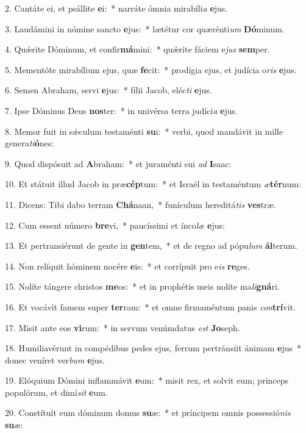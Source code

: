 2. Cantáte ei, et psállite \textbf{e}i:~*  narráte ómnia mirabíli\textit{a} \textbf{e}jus.\

3. Laudámini in nómine sancto \textbf{e}jus:~*  lætétur cor quærénti\textit{um} \textbf{Dó}minum.\

4. Quǽrite Dóminum, et confir\textbf{má}mini:~*  quǽrite fáciem e\textit{jus} \textbf{sem}per.\

5. Mementóte mirabílium ejus, quæ \textbf{fe}cit:~*  prodígia ejus, et judícia o\textit{ris} \textbf{e}jus.\

6. Semen Abraham, servi \textbf{e}jus:~*  fílii Jacob, eléc\textit{ti} \textbf{e}jus.\

7. Ipse Dóminus Deus \textbf{nos}ter:~*  in univérsa terra judíci\textit{a} \textbf{e}jus.\

8. Memor fuit in sǽculum testaménti \textbf{su}i:~*  verbi, quod mandávit in mille genera\textit{ti}\textbf{ó}nes:\

9. Quod dispósuit ad \textbf{A}braham:~*  et juraménti sui \textit{ad} \textbf{I}saac:\

10. Et státuit illud Jacob in præ\textbf{cép}tum:~*  et Israël in testaméntum \textit{æ}\textbf{tér}num:\

11. Dicens: Tibi dabo terram \textbf{Chá}naan,~*  funículum hereditá\textit{tis} \textbf{ves}træ.\

12. Cum essent número \textbf{bre}vi,~*  paucíssimi et ínco\textit{læ} \textbf{e}jus:\

13. Et pertransiérunt de gente in \textbf{gen}tem,~*  et de regno ad pópu\textit{lum} \textbf{ál}terum.\

14. Non relíquit hóminem nocére \textbf{e}is:~*  et corrípuit pro e\textit{is} \textbf{re}ges.\

15. Nolíte tángere christos \textbf{me}os:~*  et in prophétis meis nolíte ma\textit{li}\textbf{gná}ri.\

16. Et vocávit famem super \textbf{ter}ram:~*  et omne firmaméntum panis \textit{con}\textbf{trí}vit.\

17. Misit ante eos \textbf{vi}rum:~*  in servum venúmdatus \textit{est} \textbf{Jo}seph.\

18. Humiliavérunt in compédibus pedes ejus, ferrum pertránsiit ánimam \textbf{e}jus~*  donec veníret ver\textit{bum} \textbf{e}jus.\

19. Elóquium Dómini inflammávit \textbf{e}um:~*  misit rex, et solvit eum; princeps populórum, et dimí\textit{sit} \textbf{e}um.\

20. Constítuit eum dóminum domus \textbf{su}æ:~*  et príncipem omnis possessió\textit{nis} \textbf{su}æ:\

